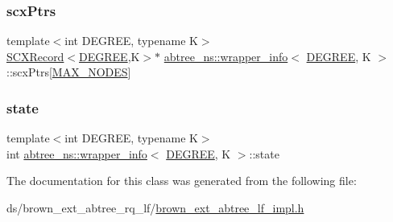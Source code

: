 \mbox{\label{classabtree__ns_1_1wrapper__info_a531a8a2aaf6256dd25d0b6ca8a1e6ced}} 
\subsubsection{\texorpdfstring{scx\+Ptrs}{scxPtrs}}
{\footnotesize\ttfamily template$<$int D\+E\+G\+R\+EE, typename K$>$ \\
\hyperlink{structabtree__ns_1_1SCXRecord}{S\+C\+X\+Record}$<$\hyperlink{brown__sigouin__abtree__kcas_2adapter_8h_a5d88b17d70c985f2f2b8e987037fd6dd}{D\+E\+G\+R\+EE},K$>$$\ast$ \hyperlink{classabtree__ns_1_1wrapper__info}{abtree\+\_\+ns\+::wrapper\+\_\+info}$<$ \hyperlink{brown__sigouin__abtree__kcas_2adapter_8h_a5d88b17d70c985f2f2b8e987037fd6dd}{D\+E\+G\+R\+EE}, K $>$\+::scx\+Ptrs\mbox{[}\hyperlink{classabtree__ns_1_1wrapper__info_a8ebdd932eb6c4c88615fbb76b8419d9e}{M\+A\+X\+\_\+\+N\+O\+D\+ES}\mbox{]}}

\mbox{\label{classabtree__ns_1_1wrapper__info_a433955bf061f62ec2942f2eacdd5a299}} 
\subsubsection{\texorpdfstring{state}{state}}
{\footnotesize\ttfamily template$<$int D\+E\+G\+R\+EE, typename K$>$ \\
int \hyperlink{classabtree__ns_1_1wrapper__info}{abtree\+\_\+ns\+::wrapper\+\_\+info}$<$ \hyperlink{brown__sigouin__abtree__kcas_2adapter_8h_a5d88b17d70c985f2f2b8e987037fd6dd}{D\+E\+G\+R\+EE}, K $>$\+::state}



The documentation for this class was generated from the following file\+:\begin{DoxyCompactItemize}
\item 
ds/brown\+\_\+ext\+\_\+abtree\+\_\+rq\+\_\+lf/\hyperlink{brown__ext__abtree__rq__lf_2brown__ext__abtree__lf__impl_8h}{brown\+\_\+ext\+\_\+abtree\+\_\+lf\+\_\+impl.\+h}\end{DoxyCompactItemize}
